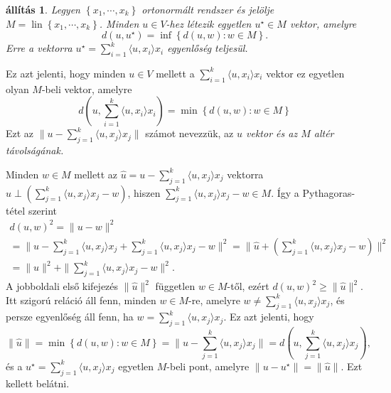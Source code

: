 \documentclass[9pt, a4paper, showtrims]{memoir}
\makeatletter
\renewenvironment{proof}[1][\proofname]
    {\par\pushQED{\qed}%
    \normalfont \topsep6\p@\@plus6\p@\relax
    \trivlist
    \item[\hskip\labelsep
        \itshape
    #1\@addpunct{:}]\ignorespaces}
    {\popQED\endtrivlist\@endpefalse}
\theoremstyle{plain}
\newtheorem{proposition}{állítás}[chapter]
\theoremstyle{remark}
\theoremstyle{definition}
\DeclareMathOperator{\lin}{lin}
\newcommand{\ip}[2]{\langle#1,#2\rangle}
\makeatother
\begin{document}
\begin{proposition}
    Legyen $\left\{ x_1,\cdots,x_k \right\}$ ortonormált rendszer és 
    jelölje $M=\lin\left\{ x_1,\cdots,x_k \right\}$.
    Minden $u\in V$-hez létezik egyetlen $u^\star\in M$
    vektor, amelyre
    \[
        d\left( u,u^\star\right)
        =
        \inf\left\{ d\left( u,w \right):w\in M \right\}.
    \]
    Erre a vektorra $u^\star=\sum_{i=1}^k\ip{u}{x_i}x_i$ egyenlőség teljesül.
\end{proposition}
Ez azt jelenti, 
hogy minden $u\in V$ mellett a 
    $\sum_{i=1}^k\ip{u}{x_i}x_i$
    vektor ez egyetlen olyan $M$-beli vektor, amelyre
    \[
        d\left( u,\sum_{i=1}^k\ip{u}{x_i}x_i \right)
        =
        \min\left\{ d\left( u,w \right):w\in M \right\}
    \]
    Ezt az 
    \begin{math}
        \|u-\sum_{j=1}^k\ip{u}{x_j}x_j\|
    \end{math}
    számot nevezzük, az \emph{$u$ vektor és az $M$ altér távolságának.}
\begin{proof}
    Minden $w\in M$ mellett az $\hat{u}=u-\sum_{j=1}^k\ip{u}{x_j}x_j$ vektorra 
    $\hat{u}\perp \left( \sum_{j=1}^k\ip{u}{x_j}x_j-w \right)$,
    hiszen $\sum_{j=1}^k\ip{u}{x_j}x_j-w\in M$.
    Így a Pythagoras-tétel szerint
    \begin{multline*}
        d\left( u,w \right)^2
        =
        \|u-w\|^2
        \\
        =
        \|u-\sum_{j=1}^k\ip{u}{x_j}x_j+\sum_{j=1}^k\ip{u}{x_j}x_j-w\|^2
        =
        \|\hat{u}+\left( \sum_{j=1}^k\ip{u}{x_j}x_j-w \right)\|^2
        \\
        =
        \|\hat{u}\|^2+\|\sum_{j=1}^k\ip{u}{x_j}x_j-w\|^2.
    \end{multline*}
    A jobboldali első kifejezés $\|\hat{u}\|^2$ független $w\in M$-től,
    ezért 
    \begin{math}
        d\left( u,w \right)^2
        \geq
        \|\hat{u}\|^2.
    \end{math}
    Itt szigorú reláció áll fenn, minden $w\in M$-re, amelyre 
    $w\neq\sum_{j=1}^k\ip{u}{x_j}x_j $, 
    és persze egyenlőség áll fenn, ha 
    $w=\sum_{j=1}^k\ip{u}{x_j}x_j $.
    Ez azt jelenti,
    hogy 
    \[
        \|\hat{u}\|
        =
        \min\left\{ d\left( u,w \right):w\in M \right\}
        =
        \| u-\sum_{j=1}^k\ip{u}{x_j}x_j\|
        =
        d\left( u,\sum_{j=1}^k\ip{u}{x_j}x_j\right),
    \]
    és a $u^\star=\sum_{j=1}^k\ip{u}{x_j}x_j $ egyetlen $M$-beli pont, amelyre $\|u-u^\star\|=\|\hat{u}\|$.
    Ezt kellett belátni. 
\end{proof}
\end{document}
